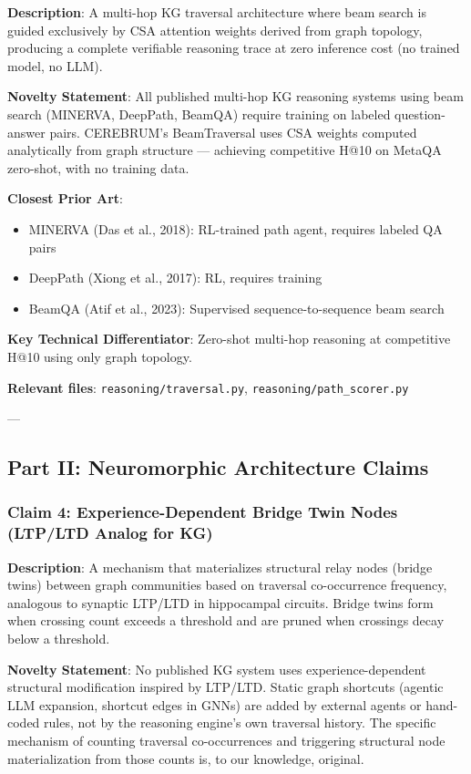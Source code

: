 \documentclass[10pt,journal,compsoc]{IEEEtran}
\begin{document}
\textbf{Description}: A multi-hop KG traversal archi\-tecture where beam search is guided exclusively by CSA attention weights derived from graph topology, producing a complete verifiable reasoning trace at zero inference cost (no trained model, no LLM).

\textbf{Novelty Statement}: All published multi-hop KG reasoning systems using beam search (MINERVA, DeepPath, BeamQA) require training on labeled question-answer pairs. CEREBRUM's BeamTraversal uses CSA weights computed analy\-tically from graph structure — achieving competitive H@10 on MetaQA zero-shot, with no training data.

\textbf{Closest Prior Art}:
\begin{itemize}
\item MINERVA (Das et al., 2018): RL-trained path agent, requires labeled QA pairs
\item DeepPath (Xiong et al., 2017): RL, requires training
\item BeamQA (Atif et al., 2023): Supervised sequence-to-sequence beam search

\end{itemize}
\textbf{Key Technical Differ\-entiator}: Zero-shot multi-hop reasoning at competitive H@10 using only graph topology.

\textbf{Relevant files}: \texttt{reasoning/traversal.py}, \texttt{reasoning/path\_scorer.py}

---

\subsection{Part II: Neurom\-orphic Archit\-ecture Claims}

\subsubsection{Claim 4: Experience-Dependent Bridge Twin Nodes (LTP/LTD Analog for KG)}

\textbf{Description}: A mechanism that mater\-ializes structural relay nodes (bridge twins) between graph communities based on traversal co-occurrence frequency, analogous to synaptic LTP/LTD in hippocampal circuits. Bridge twins form when crossing count exceeds a threshold and are pruned when crossings decay below a threshold.

\textbf{Novelty Statement}: No published KG system uses experience-dependent structural modif\-ication inspired by LTP/LTD. Static graph shortcuts (agentic LLM expansion, shortcut edges in GNNs) are added by external agents or hand-coded rules, not by the reasoning engine's own traversal history. The specific mechanism of counting traversal co-occurrences and triggering structural node mater\-ialization from those counts is, to our knowledge, original.
\end{document}

